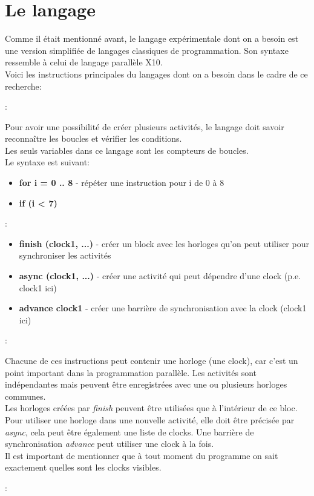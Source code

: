 \documentclass[12pt]{scrartcl}
\begin{document}
\section{Le langage}
 Comme il était mentionné avant, le langage expérimentale dont on a besoin est une version simplifiée de langages classiques de programmation. 
 Son syntaxe ressemble à celui de langage parallèle X10. \\
 
 Voici les instructions principales du langages dont on a besoin dans le cadre de ce recherche: \\


 \begin{description}[itemsep=2em]
  \item[Boucles et Tests] :

  Pour avoir une possibilité de créer plusieurs activités, le langage doit savoir reconnaître les boucles et vérifier 
  les conditions. \\ Les seuls variables dans ce langage sont les compteurs de boucles. \\Le syntaxe est suivant: 
  \begin{itemize} 
    \item \textbf{for i = 0 .. 8 {}} - répéter une instruction pour i de 0 à 8
    \item \textbf{if (i < 7) {}}
  \end{itemize} 


\item[Les instructions de programmation parallèle] :

\begin{itemize} 
  \item \textbf{finish (clock1, ...) {}} - créer un block avec les horloges qu'on peut utiliser pour synchroniser les activités
  \item \textbf{async (clock1, ...) {}} - créer une activité qui peut dépendre d'une clock (p.e. clock1 ici)
  \item \textbf{advance clock1} - créer une barrière de synchronisation avec la clock (clock1 ici)
\end{itemize} 
\newpage
\item[Les horloges] :
 
Chacune de ces instructions peut contenir une horloge (une clock), car c'est un point important dans la programmation parallèle. Les activités sont
indépendantes mais peuvent être enregistrées avec une ou plusieurs horloges communes.\\
Les horloges créées par \textit{finish} peuvent être utilisées que à l'intérieur de ce bloc. Pour utiliser une horloge dans une nouvelle activité, 
elle doit être précisée par \textit{async}, cela peut être également une liste de clocks. Une barrière de synchronisation \textit{advance} peut utiliser une clock à la fois.\\
Il est important de mentionner que à tout moment du programme on sait exactement quelles sont les clocks visibles.
\item[les instructions] : 
 

\end{description}
\end{document}
